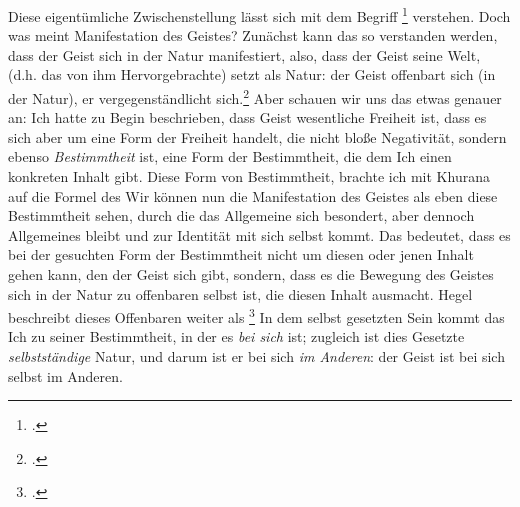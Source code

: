 \documentclass[12pt, a4paper, openany]{report}
\begin{document}
Diese eigentümliche Zwischenstellung lässt sich mit dem Begriff \footcite[][140]{menke_autonomie_2018} verstehen. 
Doch was meint Manifestation des Geistes?
Zunächst kann das so verstanden werden, dass der Geist sich in der Natur manifestiert, also, dass der Geist seine Welt, (d.h. das von ihm Hervorgebrachte) setzt als Natur: der Geist offenbart sich (in der Natur), er vergegenständlicht sich.\footcite[Vgl.][143]{menke_autonomie_2018}
Aber schauen wir uns das etwas genauer an:
Ich hatte zu Begin beschrieben, dass Geist wesentliche Freiheit ist, dass es sich aber um eine Form der Freiheit handelt, die nicht bloße Negativität, sondern ebenso \emph{Bestimmtheit} ist, eine Form der Bestimmtheit, die dem Ich einen konkreten Inhalt gibt.
Diese Form von Bestimmtheit, brachte ich mit Khurana auf die Formel des 
Wir können nun die Manifestation des Geistes als eben diese Bestimmtheit sehen, durch die das Allgemeine sich besondert, aber dennoch Allgemeines bleibt und zur Identität mit sich selbst kommt.
Das bedeutet, dass es bei der gesuchten Form der Bestimmtheit nicht um diesen oder jenen Inhalt gehen kann, den der Geist sich gibt, sondern, dass es die Bewegung des Geistes sich in der Natur zu offenbaren selbst ist, die diesen Inhalt ausmacht. 
Hegel beschreibt dieses Offenbaren weiter als \footcite[][§ 384, S. 29]{menke_autonomie_2018} 
In dem selbst gesetzten Sein kommt das Ich zu seiner Bestimmtheit, in der es \emph{bei sich} ist; zugleich ist dies Gesetzte \emph{selbstständige} Natur, und darum ist er bei sich \emph{im Anderen}: 
der Geist ist bei sich selbst im Anderen.\\
\end{document}
